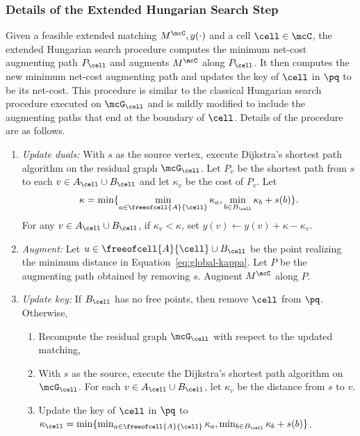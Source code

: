 \subsubsection{Details of the Extended Hungarian Search Step}\label{subsubsec:global} 
Given a feasible extended matching $M^\mcC, y(\cdot)$  and a cell $\cell\in\mcC$, the extended Hungarian search procedure computes the minimum net-cost augmenting path $P_\cell$ and augments $M^\mcC$ along $P_\cell$. It then computes the new minimum net-cost augmenting path and updates the key of $\cell$ in $\pq$ to be its net-cost. 
This procedure is similar to the classical Hungarian search procedure executed on $\mcG_\cell$ and is mildly modified to include the augmenting paths that end at the boundary of $\cell$. 
Details of the procedure are as follows. 
\begin{enumerate}
\item {\it Update duals:} With $s$ as the source vertex, execute Dijkstra's shortest path algorithm on the residual graph $\mcG_\cell$. Let $P_v$ be the shortest path from $s$ to each $v\in A_\cell\cup B_\cell$ and let $\kappa_v$ be the cost of $P_v$. Let
\begin{equation}\label{eq:global-kappa}
    \kappa = \min\{ \min_{a\in \freeofcell{A}{\cell}}\kappa_a, \min_{b\in B_\cell}\kappa_b + s(b)\}.
\end{equation}
For any $v \in A_\cell\cup B_\cell$, if $\kappa_v < \kappa$, set $ y(v) \leftarrow y(v) +\kappa - \kappa_v$.
\item {\it Augment:} Let $u\in \freeofcell{A}{\cell}\cup B_\cell$ be the point realizing the minimum distance in Equation~\eqref{eq:global-kappa}. Let $P$ be the augmenting path obtained by removing $s$. Augment $M^\mcC$ along $P$. 
\item {\it Update key:} If $B_\cell$ has no free points, then remove $\cell$ from $\pq$. Otherwise,
\begin{enumerate}
    \item Recompute the residual graph $\mcG_{\cell}$ with respect to the updated matching,
    \item With $s$ as the source, execute the Dijkstra's shortest path algorithm on $\mcG_\cell$. For each $v \in A_\cell\cup B_\cell$, let $\kappa_v$ be the distance from $s$ to $v$.
    \item  Update the key of $\cell$ in $\pq$ to $\kappa_\cell = \min\{ \min_{a\in \freeofcell{A}{\cell}}\kappa_a, \min_{b\in B_\cell}\kappa_b + s(b)\}$.
\end{enumerate}   
\end{enumerate}
%


